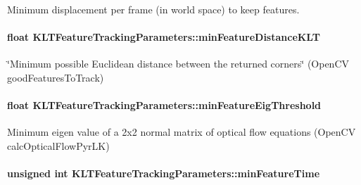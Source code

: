 Minimum displacement per frame (in world space) to keep features. 

\hypertarget{structKLTFeatureTrackingParameters_af9ba36e53a3954620a535fdee4f04686}{
\paragraph[{min\-Feature\-Distance\-K\-L\-T}]{\setlength{\rightskip}{0pt plus 5cm}float K\-L\-T\-Feature\-Tracking\-Parameters\-::min\-Feature\-Distance\-K\-L\-T}}\label{structKLTFeatureTrackingParameters_af9ba36e53a3954620a535fdee4f04686}


\char`\"{}\-Minimum possible Euclidean distance between the returned corners\char`\"{} (Open\-C\-V good\-Features\-To\-Track) 

\hypertarget{structKLTFeatureTrackingParameters_a9276bdc0bbba6a06cab152993a774be8}{
\paragraph[{min\-Feature\-Eig\-Threshold}]{\setlength{\rightskip}{0pt plus 5cm}float K\-L\-T\-Feature\-Tracking\-Parameters\-::min\-Feature\-Eig\-Threshold}}\label{structKLTFeatureTrackingParameters_a9276bdc0bbba6a06cab152993a774be8}


Minimum eigen value of a 2x2 normal matrix of optical flow equations (Open\-C\-V calc\-Optical\-Flow\-Pyr\-L\-K) 

\hypertarget{structKLTFeatureTrackingParameters_ae695d0f6bf3e578e744ae94f85b53009}{
\paragraph[{min\-Feature\-Time}]{\setlength{\rightskip}{0pt plus 5cm}unsigned int K\-L\-T\-Feature\-Tracking\-Parameters\-::min\-Feature\-Time}}\label{structKLTFeatureTrackingParameters_ae695d0f6bf3e578e744ae94f85b53009}


